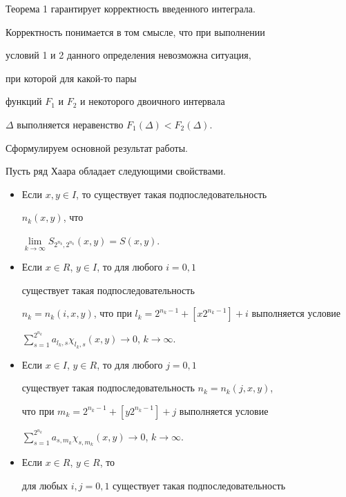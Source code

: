 Теорема 1 гарантирует корректность введенного интеграла. 


Корректность понимается в том смысле, что при выполнении 


условий 1 и 2 данного определения невозможна ситуация, 


при которой для какой-то пары 


функций $F_1$ и $F_2$ и некоторого двоичного интервала 


$\Delta$ выполняется неравенство $F_1(\Delta)<F_2(\Delta)$.





Сформулируем основной результат работы.





\begin{thm}


Пусть ряд Хаара обладает следующими свойствами.


\begin{itemize}


\item[1.] Если $x,y \in I$, то существует такая подпоследовательность 


$n_k(x,y)$, что 


$\lim\limits_{k \to \infty} S_{2^{n_k},2^{n_k}}(x,y)=S(x,y)$.


\item[2.] Если $x \in R$, $y \in I$, то для любого $i=0,1$ 


существует такая подпоследовательность 


$n_k=n_{k}(i,x,y)$, что при $l_k=2^{n_k-1}+[x2^{n_k-1}]+i$ выполняется условие 


$\sum\limits_{s=1}^{2^{n_k}}a_{l_k,s}


\chi_{l_k,s}(x,y) \to 0$, $k \to \infty$. 


\item[3.] Если $x \in I$, $y \in R$, то для любого $j=0,1$ 


существует такая подпоследовательность $n_k=n_{k}(j,x,y)$, 


что при $m_k=2^{n_k-1}+[y2^{n_k-1}]+j$ выполняется условие 


$\sum\limits_{s=1}^{2^{n_k}}a_{s,m_k}


\chi_{s,m_k}(x,y) \to 0$, $k \to \infty$. 


\item[4.] Если $x \in R$, $y \in R$, то 


для любых $i,j=0,1$ существует такая подпоследовательность 



\end{itemize}
\end{thm}
